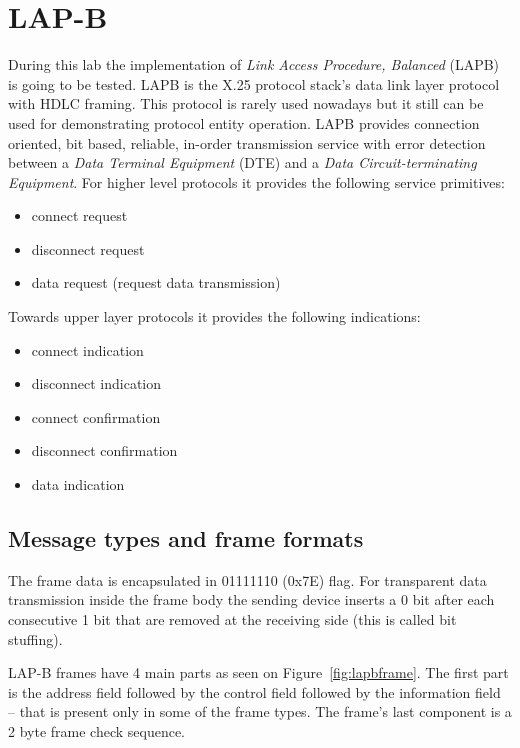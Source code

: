 \documentclass[a4paper]{article}
\begin{document}
\section{LAP-B}

During this lab the implementation of  \emph{Link Access Procedure, Balanced} (LAPB) is going to be tested. LAPB is the
X.25 protocol stack's data link layer protocol with HDLC framing. This protocol is rarely used nowadays but it still
can be used for demonstrating protocol entity operation. LAPB provides connection oriented, bit based, reliable,
in-order transmission service with error detection between a \emph{Data Terminal Equipment} (DTE) and a \emph{Data
    Circuit-terminating Equipment}. For higher level protocols it provides the following service primitives:
\begin{itemize}
    \item connect request
    \item disconnect request
    \item data request (request data transmission)
\end{itemize}
Towards upper layer protocols it provides the following indications:
\begin{itemize}
    \item connect indication
    \item disconnect indication
    \item connect confirmation
    \item disconnect confirmation
    \item data indication
\end{itemize}

\subsection{Message types and frame formats}

The frame data is encapsulated in 01111110 (0x7E) flag. For transparent data transmission inside the frame body the
sending device inserts a 0 bit after each consecutive 1 bit that are removed at the receiving side (this is called bit
stuffing).

LAP-B frames have 4 main parts as seen on Figure~\ref{fig:lapbframe}. The first part is the address field followed by
the control field followed by the information field -- that is present only in some of the frame types. The frame's
last component is a 2 byte frame check sequence.
\end{document}
